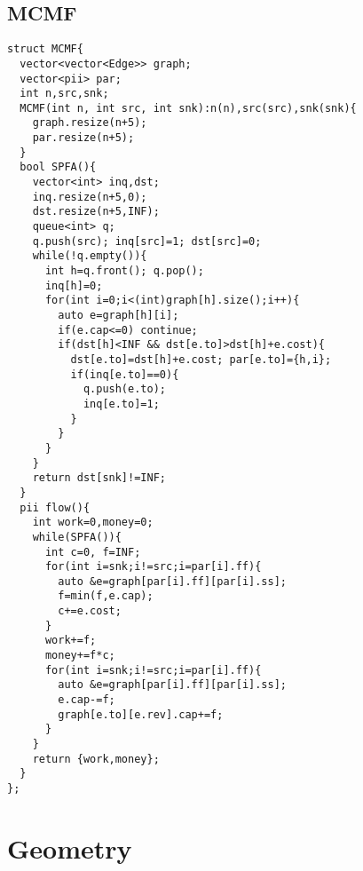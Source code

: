 \documentclass[landscape, 8pt, a4paper, oneside, twocolumn]{extarticle}
\begin{document}
\subsection{MCMF}
\begin{verbatim}
struct MCMF{
  vector<vector<Edge>> graph;
  vector<pii> par;
  int n,src,snk;
  MCMF(int n, int src, int snk):n(n),src(src),snk(snk){
    graph.resize(n+5);
    par.resize(n+5);
  }
  bool SPFA(){
    vector<int> inq,dst;
    inq.resize(n+5,0);
    dst.resize(n+5,INF);    
    queue<int> q;
    q.push(src); inq[src]=1; dst[src]=0;
    while(!q.empty()){
      int h=q.front(); q.pop();
      inq[h]=0;
      for(int i=0;i<(int)graph[h].size();i++){
        auto e=graph[h][i];
        if(e.cap<=0) continue;
        if(dst[h]<INF && dst[e.to]>dst[h]+e.cost){
          dst[e.to]=dst[h]+e.cost; par[e.to]={h,i};
          if(inq[e.to]==0){
            q.push(e.to);
            inq[e.to]=1;
          }
        }
      }
    }
    return dst[snk]!=INF;
  }
  pii flow(){
    int work=0,money=0;
    while(SPFA()){
      int c=0, f=INF;
      for(int i=snk;i!=src;i=par[i].ff){
        auto &e=graph[par[i].ff][par[i].ss];
        f=min(f,e.cap);
        c+=e.cost;
      }
      work+=f;
      money+=f*c;
      for(int i=snk;i!=src;i=par[i].ff){
        auto &e=graph[par[i].ff][par[i].ss];
        e.cap-=f;
        graph[e.to][e.rev].cap+=f;
      }
    }
    return {work,money};
  }
};
\end{verbatim}

\section{Geometry}
\end{document}
